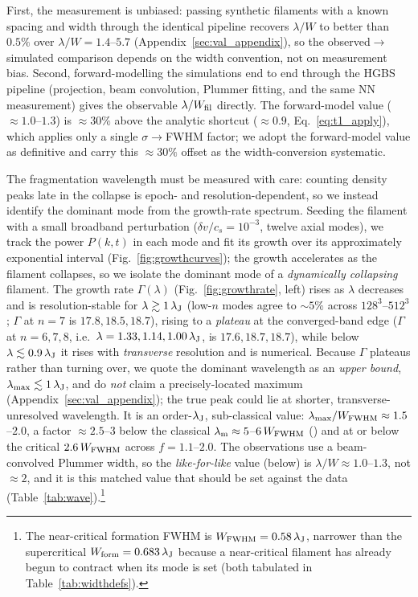 \documentclass[usenatbib,twoside,twocolumn]{mnras}
\begin{document}
First, the measurement is unbiased: passing synthetic filaments with a known spacing and width through the identical pipeline recovers $\lambda/W$ to better than $0.5\%$ over $\lambda/W=1.4$--$5.7$ (Appendix~\ref{sec:val_appendix}), so the observed$\to$simulated comparison depends on the width convention, not on measurement bias. Second, forward-modelling the simulations end to end through the HGBS pipeline (projection, beam convolution, Plummer fitting, and the same NN measurement) gives the observable $\lambda/W_{\rm fil}$ directly. The forward-model value ($\approx1.0$--$1.3$) is $\approx30\%$ above the analytic shortcut ($\approx0.9$, Eq.~\ref{eq:t1_apply}), which applies only a single $\sigma\!\to\!$FWHM factor; we adopt the forward-model value as definitive and carry this $\approx30\%$ offset as the width-conversion systematic.

The fragmentation wavelength must be measured with care: counting density peaks late in the collapse is epoch- and resolution-dependent, so we instead identify the dominant mode from the growth-rate spectrum. Seeding the filament with a small broadband perturbation ($\delta v/c_s=10^{-3}$, twelve axial modes), we track the power $P(k,t)$ in each mode and fit its growth over its approximately exponential interval (Fig.~\ref{fig:growthcurves}); the growth accelerates as the filament collapses, so we isolate the dominant mode of a \emph{dynamically collapsing} filament. The growth rate $\Gamma(\lambda)$ (Fig.~\ref{fig:growthrate}, left) rises as $\lambda$ decreases and is resolution-stable for $\lambda\gtrsim1\,\lambda_{\rm J}$ (low-$n$ modes agree to $\sim5\%$ across $128^3$--$512^3$; $\Gamma$ at $n=7$ is $17.8,18.5,18.7$), rising to a \emph{plateau} at the converged-band edge ($\Gamma$ at $n=6,7,8$, i.e.\ $\lambda=1.33,1.14,1.00\,\lambda_{\rm J}$, is $17.6,18.7,18.7$), while below $\lambda\lesssim0.9\,\lambda_{\rm J}$ it rises with \emph{transverse} resolution and is numerical. Because $\Gamma$ plateaus rather than turning over, we quote the dominant wavelength as an \emph{upper bound}, $\lambda_{\rm max}\lesssim1\,\lambda_{\rm J}$, and do \emph{not} claim a precisely-located maximum (Appendix~\ref{sec:val_appendix}); the true peak could lie at shorter, transverse-unresolved wavelength. It is an order-$\lambda_{\rm J}$, sub-classical value: $\lambda_{\rm max}/W_{\rm FWHM}\approx1.5$--$2.0$, a factor $\approx2.5$--$3$ below the classical $\lambda_{\rm m}\approx5$--$6\,W_{\rm FWHM}$ (\citealt{Fischera2012}) and at or below the critical $2.6\,W_{\rm FWHM}$ across $f=1.1$--$2.0$. The observations use a beam-convolved Plummer width, so the \emph{like-for-like} value (below) is $\lambda/W\approx1.0$--$1.3$, not $\approx2$, and it is this matched value that should be set against the data (Table~\ref{tab:wave}).\footnote{The near-critical formation FWHM is $W_{\rm FWHM}=0.58\,\lambda_{\rm J}$, narrower than the supercritical $W_{\rm form}=0.683\,\lambda_{\rm J}$ because a near-critical filament has already begun to contract when its mode is set (both tabulated in Table~\ref{tab:widthdefs}).}
\end{document}
